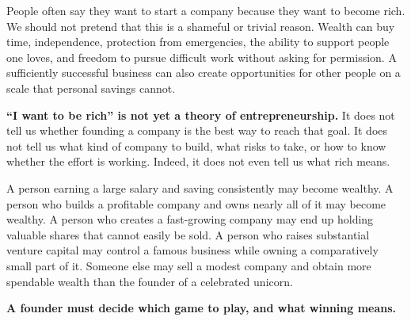 People often say they want to start a company because they want to become rich. We should not pretend that this is a shameful or trivial reason. Wealth can buy time, independence, protection from emergencies, the ability to support people one loves, and freedom to pursue difficult work without asking for permission. A sufficiently successful business can also create opportunities for other people on a scale that personal savings cannot.

\textbf{“I want to be rich” is not yet a theory of entrepreneurship.} It does not tell us whether founding a company is the best way to reach that goal. It does not tell us what kind of company to build, what risks to take, or how to know whether the effort is working. Indeed, it does not even tell us what rich means.

A person earning a large salary and saving consistently may become wealthy. A person who builds a profitable company and owns nearly all of it may become wealthy. A person who creates a fast-growing company may end up holding valuable shares that cannot easily be sold. A person who raises substantial venture capital may control a famous business while owning a comparatively small part of it. Someone else may sell a modest company and obtain more spendable wealth than the founder of a celebrated unicorn.

\textbf{A founder must decide which game to play, and what winning means.}
